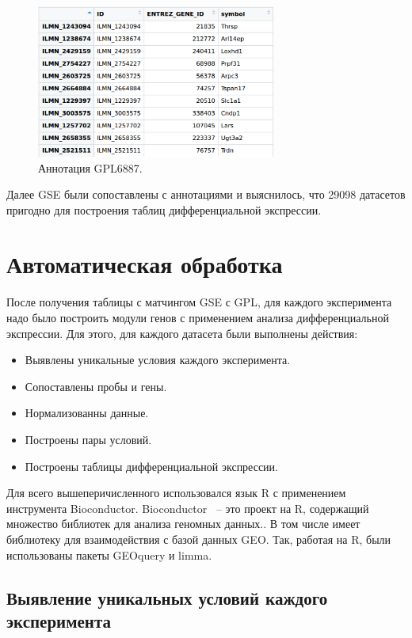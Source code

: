 \documentclass[times,specification,annotation]{itmo-student-thesis}
\begin{document}
\begin{figure}[!h]
    \caption{Аннотация GPL6887.}\label{GPL6887}
    \centering
    \includegraphics[width=0.7\textwidth]{GPL6887.png}
\end{figure} 

Далее GSE были сопоставлены с аннотациями и выяснилось, что 29098 датасетов пригодно для построения таблиц ​дифференциальной экспрессии.


\section{Автоматическая обработка}

После получения таблицы с матчингом GSE с GPL, для каждого эксперимента надо было построить модули генов с применением анализа дифференциальной экспрессии. Для этого, для каждого датасета были выполнены действия:
\begin{itemize}
    \item Выявлены уникальные условия каждого эксперимента.
    \item Сопоставлены пробы и гены.
    \item Нормализованны данные.
    \item Построены пары условий.
    \item Построены таблицы дифференциальной экспрессии.
\end{itemize}

Для всего вышеперичисленного использовался язык R с применением инструмента Bioconductor. Bioconductor ~-- это проект на R, содержащий множество библиотек для анализа геномных данных.\cite{Bioconductor}. В том числе имеет библиотеку для взаимодействия с базой данных GEO. Так, работая на R, были использованы пакеты GEOquery и limma. 

\subsection{Выявление уникальных условий каждого эксперимента}
\end{document}
